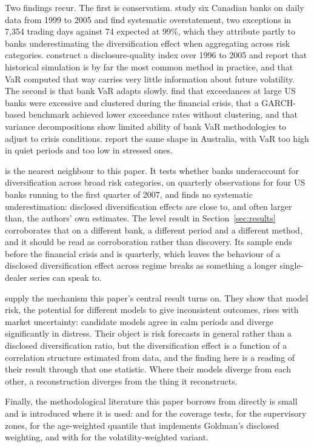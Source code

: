 Two findings recur. The first is conservatism.
\citet{perignon2008overstate} study six Canadian banks on daily data from 1999
to 2005 and find systematic overstatement, two exceptions in 7,354 trading
days against 74 expected at 99\%, which they attribute partly to banks
underestimating the diversification effect when aggregating across risk
categories. \citet{perignon2010level} construct a disclosure-quality index over
1996 to 2005 and report that historical simulation is by far the most common
method in practice, and that VaR computed that way carries very little
information about future volatility. The second is that bank VaR adapts slowly.
\citet{obrien2017evaluation} find that exceedances at large US banks were
excessive and clustered during the financial crisis, that a GARCH-based
benchmark achieved lower exceedance rates without clustering, and that variance
decompositions show limited ability of bank VaR methodologies to adjust to
crisis conditions. \citet{campbell2022australia} report the same shape in
Australia, with VaR too high in quiet periods and too low in stressed ones.

\citet{perignon2010diversification} is the nearest neighbour to this paper. It
tests whether banks underaccount for diversification across broad risk
categories, on quarterly observations for four US banks running to the first
quarter of 2007, and finds no systematic underestimation: disclosed
diversification effects are close to, and often larger than, the authors' own
estimates. The level result in Section~\ref{sec:results} corroborates that on a
different bank, a different period and a different method, and it should be read
as corroboration rather than discovery. Its sample ends before the financial
crisis and is quarterly, which leaves the behaviour of a disclosed
diversification effect across regime breaks as something a longer single-dealer
series can speak to.

\citet{danielsson2016modelrisk} supply the mechanism this paper's central
result turns on. They show that model risk, the potential for different
models to give inconsistent outcomes, rises with market uncertainty:
candidate models agree in calm periods and diverge significantly in distress.
Their object is risk forecasts in general rather than a disclosed
diversification ratio, but the diversification effect is a function of a
correlation structure estimated from data, and the finding here is a reading of
their result through that one statistic. Where their models diverge from each
other, a reconstruction diverges from the thing it reconstructs.

Finally, the methodological literature this paper borrows from directly is
small and is introduced where it is used:
\citet{kupiec1995} and \citet{christoffersen1998} for the coverage tests,
\citet{bcbs1996backtesting} for the supervisory zones,
\citet{boudoukh1998hybrid} for the age-weighted quantile that implements
Goldman's disclosed weighting, and \citet{hullwhite1998} with
\citet{riskmetrics1996} for the volatility-weighted variant.
